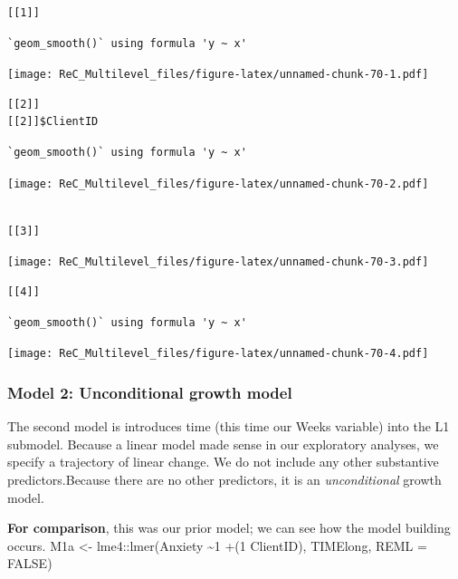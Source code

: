 \documentclass[
  english,
]{book}
\begin{document}
\begin{verbatim}
[[1]]
\end{verbatim}

\begin{verbatim}
`geom_smooth()` using formula 'y ~ x'
\end{verbatim}

\texttt{[image: ReC\_Multilevel\_files/figure-latex/unnamed-chunk-70-1.pdf]}

\begin{verbatim}
[[2]]
[[2]]$ClientID
\end{verbatim}

\begin{verbatim}
`geom_smooth()` using formula 'y ~ x'
\end{verbatim}

\texttt{[image: ReC\_Multilevel\_files/figure-latex/unnamed-chunk-70-2.pdf]}

\begin{verbatim}

[[3]]
\end{verbatim}

\texttt{[image: ReC\_Multilevel\_files/figure-latex/unnamed-chunk-70-3.pdf]}

\begin{verbatim}
[[4]]
\end{verbatim}

\begin{verbatim}
`geom_smooth()` using formula 'y ~ x'
\end{verbatim}

\texttt{[image: ReC\_Multilevel\_files/figure-latex/unnamed-chunk-70-4.pdf]}

\hypertarget{model-2-unconditional-growth-model}{%
\subsubsection{Model 2: Unconditional growth model}\label{model-2-unconditional-growth-model}}

The second model is introduces time (this time our Weeks variable) into the L1 submodel. Because a linear model made sense in our exploratory analyses, we specify a trajectory of linear change. We do not include any other substantive predictors.Because there are no other predictors, it is an \emph{unconditional} growth model.

\textbf{For comparison}, this was our prior model; we can see how the model building occurs.
M1a \textless- lme4::lmer(Anxiety \textasciitilde1 +(1 \textbar{} ClientID), TIMElong, REML = FALSE)
\end{document}
